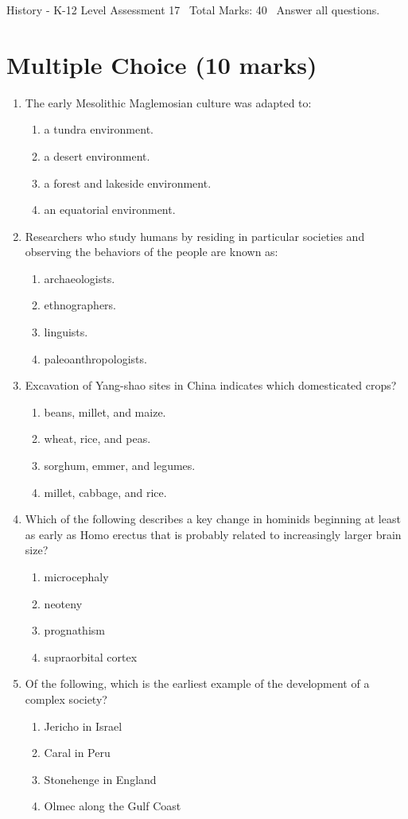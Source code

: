 \documentclass[12pt]{article}
\begin{document}
\begin{center}
History - K-12 Level Assessment 17 \
Total Marks: 40 \
Answer all questions.
\end{center}

\section*{Multiple Choice (10 marks)}
\begin{enumerate}[label=\arabic*.]
\item The early Mesolithic Maglemosian culture was adapted to:
\begin{enumerate}[label=(\alph*)]
    \item a tundra environment.
    \item a desert environment.
    \item a forest and lakeside environment.
    \item an equatorial environment.
\end{enumerate}
\item Researchers who study humans by residing in particular societies and observing the behaviors of the people are known as:
\begin{enumerate}[label=(\alph*)]
    \item archaeologists.
    \item ethnographers.
    \item linguists.
    \item paleoanthropologists.
\end{enumerate}
\item Excavation of Yang-shao sites in China indicates which domesticated crops?
\begin{enumerate}[label=(\alph*)]
    \item beans, millet, and maize.
    \item wheat, rice, and peas.
    \item sorghum, emmer, and legumes.
    \item millet, cabbage, and rice.
\end{enumerate}
\item Which of the following describes a key change in hominids beginning at least as early as Homo erectus that is probably related to increasingly larger brain size?
\begin{enumerate}[label=(\alph*)]
    \item microcephaly
    \item neoteny
    \item prognathism
    \item supraorbital cortex
\end{enumerate}
\item Of the following, which is the earliest example of the development of a complex society?
\begin{enumerate}[label=(\alph*)]
    \item Jericho in Israel
    \item Caral in Peru
    \item Stonehenge in England
    \item Olmec along the Gulf Coast
\end{enumerate}
\end{enumerate}
\end{document}
